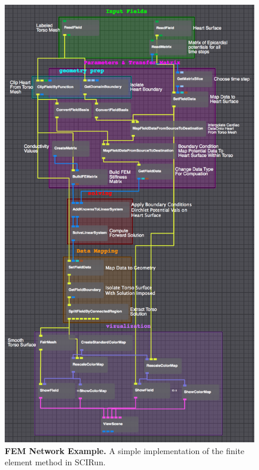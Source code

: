 \begin{figure}[H]
\vspace{-.25in}
\begin{center}
\includegraphics[width=.7\textwidth]{ECGToolkitGuide_figures/PotBasedFEM_Lap.png}
\caption{{\bf FEM Network Example.} A simple implementation of the finite element method in SCIRun.}
\label{fig:PotBasedFEM_Lap}
\end{center}
\vspace{-.25in}
\end{figure}

